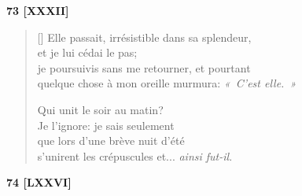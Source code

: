 \documentclass[a4paper,12pt]{book}
\begin{document}
\bigskip

\begin{center}
  \textbf{73 [XXXII]}
\end{center}

\settowidth{\versewidth}{je poursuivis sans me retourner, et pourtant}

\begin{verse}[\versewidth]
  Elle passait, irrésistible dans sa splendeur, \\
  et je lui cédai le pas; \\
  je poursuivis sans me retourner, et pourtant \\
  quelque chose à mon oreille murmura: \emph{«~C'est elle.~»}

  Qui unit le soir au matin? \\
  Je l'ignore: je sais seulement \\
  que lors d'une brève nuit d'été \\
  s'unirent les crépuscules et... \emph{ainsi fut-il}.
\end{verse}

\bigskip

\begin{center}
  \textbf{74 [LXXVI]}
\end{center}

\settowidth{\versewidth}{« Oh, quel amour sans paroles que celui de la mort!}
\end{document}
